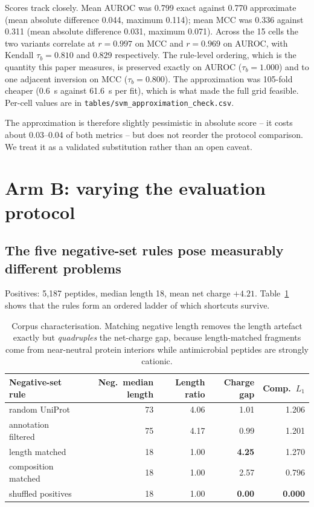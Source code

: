 \documentclass[11pt,a4paper]{article}
\begin{document}
Scores track closely. Mean AUROC was 0.799 exact against 0.770 approximate (mean absolute
difference 0.044, maximum 0.114); mean MCC was 0.336 against 0.311 (mean absolute difference
0.031, maximum 0.071). Across the 15 cells the two variants correlate at $r = 0.997$ on MCC
and $r = 0.969$ on AUROC, with Kendall $\tau_b = 0.810$ and $0.829$ respectively. The
rule-level ordering, which is the quantity this paper measures, is preserved exactly on
AUROC ($\tau_b = 1.000$) and to one adjacent inversion on MCC ($\tau_b = 0.800$). The
approximation was 105-fold cheaper (\SI{0.6}{\second} against \SI{61.6}{\second} per fit),
which is what made the full grid feasible. Per-cell values are in
\texttt{tables/svm\_approximation\_check.csv}.

The approximation is therefore slightly pessimistic in absolute score -- it costs about
0.03--0.04 of both metrics -- but does not reorder the protocol comparison. We treat it as
a validated substitution rather than an open caveat.

\section{Arm B: varying the evaluation protocol}

\subsection{The five negative-set rules pose measurably different problems}

Positives: 5{,}187 peptides, median length 18, mean net charge $+4.21$.
Table~\ref{tab:ladder} shows that the rules form an ordered ladder of which shortcuts
survive.

\begin{table}[htbp]\centering\small
\caption{Corpus characterisation. Matching negative length removes the length artefact
exactly but \emph{quadruples} the net-charge gap, because length-matched fragments come
from near-neutral protein interiors while antimicrobial peptides are strongly cationic.}
\label{tab:ladder}
\begin{tabular}{lrrrr}
\toprule
Negative-set rule & Neg.\ median length & Length ratio & Charge gap & Comp.\ $L_1$ \\
\midrule
random UniProt       & 73 & 4.06 & 1.01 & 1.206 \\
annotation filtered  & 75 & 4.17 & 0.99 & 1.201 \\
length matched       & 18 & 1.00 & \textbf{4.25} & 1.270 \\
composition matched  & 18 & 1.00 & 2.57 & 0.796 \\
shuffled positives   & 18 & 1.00 & \textbf{0.00} & \textbf{0.000} \\
\bottomrule
\end{tabular}
\end{table}
\end{document}
